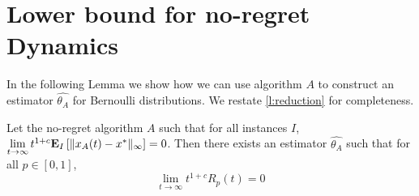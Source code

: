 \section{Lower bound for no-regret Dynamics}\label{app:s:lower_bound}

In the following Lemma we show how we can use algorithm $A$ to construct an
estimator $\hat{\theta_A}$ for Bernoulli distributions.
We restate \ref{l:reduction} for completeness.
\begin{theorem}

  Let the no-regret algorithm $A$ such that
  for all instances $I$, $\lim \limits_{t \rightarrow \infty} t^{1+c}
  \bm{\mathrm{E}}_{I} \left[ \| x_A(t)-x^* \|_{\infty} \right]=0$.  Then there exists an estimator
  $\hat{\theta_A}$ such that for all
  $p \in [0,1]$, \[\lim_{t \rightarrow \infty}t^{1+c}R_p(t)=0\]

\end{theorem}

